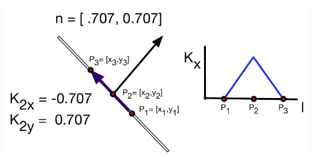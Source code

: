 \documentclass{article}
\newcommand{\0}{\varnothing}
\begin{document}
\begin{minipage}{0.45\textwidth}
\begin{center}
\includegraphics[width=1\columnwidth]{figures/SegDerv}
\end{center}
\end{minipage}
\begin{minipage}{0.5\textwidth}
\end{minipage}

\newpage


\end{document}
